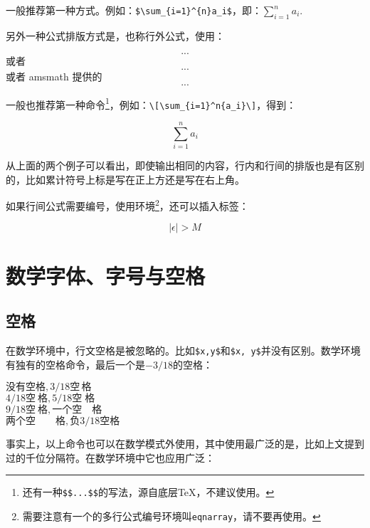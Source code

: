 一般推荐第一种方式。例如：\verb|$\sum_{i=1}^{n}a_i$|，即：$\sum_{i=1}^{n}a_i$.

另外一种公式排版方式是，也称行外公式，使用：
\begin{latex}
\[...\] 或者 \begin{displaymath}...\end{displaymath}
或者 amsmath 提供的 \begin{equation*}...\end{equation*}
\end{latex}

一般也推荐第一种命令\footnote{还有一种\texttt{\$\$...\$\$}的写法，源自底层\TeX，不建议使用。}，例如：\verb|\[\sum_{i=1}^n{a_i}\]|，得到：

\[\sum_{i=1}^{n}a_i\]

从上面的两个例子可以看出，即使输出相同的内容，行内和行间的排版也是有区别的，比如累计符号上标是写在正上方还是写在右上角。

如果行间公式需要编号，使用环境\footnote{需要注意有一个的多行公式编号环境叫\texttt{eqnarray}，请不要再使用。}，还可以插入标签：

\begin{codeshow}
\begin{equation}
\label{eq:NoExample}
  |\epsilon|>M
\end{equation}
\end{codeshow}

\section{数学字体、字号与空格}
\label{sec:mathfont}
\subsection{空格}
在数学环境中，行文空格是被忽略的。比如\verb|$x,y$|和\verb|$x, y$|并没有区别。数学环境有独有的空格命令，最后一个是$-3/18$的空格：

\begin{codeshow}
  $没有空格,3/18空\,格$ \\
  $4/18空\:格,5/18空\;格$ \\
  $9/18空\ 格,一个空\quad 格$ \\
  $两个空\qquad 格,负3/18空\!格$
\end{codeshow}

事实上，以上命令也可以在数学模式外使用，其中使用最广泛的是\latexline{,}，比如上文提到过的千位分隔符。在数学环境中它也应用广泛：

